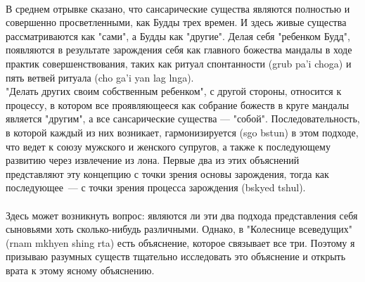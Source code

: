 \begin{siderules}
\\
В среднем отрывке сказано, что сансарические существа являются полностью и совершенно
просветленными, как Будды трех времен. И здесь живые существа рассматрива\-ются как
"сами", а Будды как "другие". Делая себя "ребенком Будд", появляются в результате
зарождения себя как глав\-ного божества мандалы в ходе практик совершенствования,
таких как ритуал спонтанности (grub pa'i choga) и пять ветвей ритуала (cho ga'i yan lag lnga).\\
\newpage
"Делать других своим собственным ребенком", с другой стороны, относится к процессу,
в котором все проявляющееся как собрание божеств в круге мандалы является "другим",
а все сансарические существа — "собой". Последовательность, в которой каждый из них возникает,
гармонизируется (sgo bstun) в этом подходе, что ведет к союзу мужского и женского
супругов, а также к последующему развитию через извлечение из лона. Первые два из этих
объяснений представляют эту концепцию с точки зрения основы зарож\-дения, тогда как
последующее — с точки зрения процесса зарождения (bskyed tshul).\\
\\
Здесь может возникнуть вопрос: являются ли эти два подхода представления себя сыновьями
хоть сколько-нибудь различными. Однако, в "Колеснице всеведущих" (rnam mkhyen shing
rta) есть объяснение, которое связывает все три. Поэтому я призываю разумных существ
тщательно исследовать это объяснение и открыть врата к этому ясному объяснению.
\end{siderules}
\newpage

